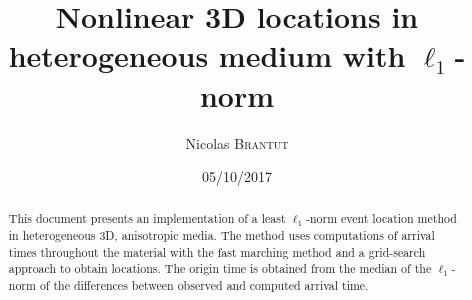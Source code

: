 \documentclass{article}
\title{Nonlinear 3D locations in heterogeneous medium with $\ell_1$-norm}
\author{Nicolas \textsc{Brantut}}
\date{05/10/2017}
\begin{document}
\maketitle

\begin{abstract}
This document presents an implementation of a least $\ell_1$-norm event location method in heterogeneous 3D, anisotropic media. The method uses computations of arrival times throughout the material with the fast marching method and a grid-search approach to obtain locations. The origin time is obtained from the median of the $\ell_1$-norm of the differences between observed and computed arrival time.
\end{abstract}

\section{}

\section{}
\end{document}
